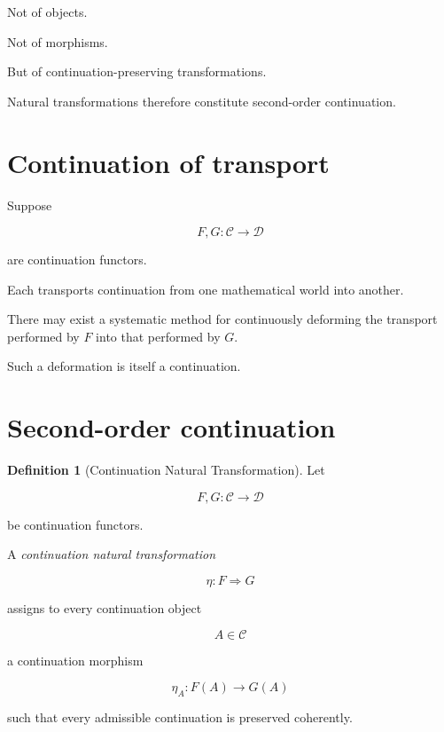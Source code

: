 \documentclass[13pt,openany]{book}
\theoremstyle{plain}
\theoremstyle{definition}
\newtheorem{definition}{Definition}[chapter]
\begin{document}
Not of objects.

Not of morphisms.

But of continuation-preserving transformations.

Natural transformations therefore constitute second-order continuation.

\section{Continuation of transport}

Suppose

\[
F,G:\mathcal C\longrightarrow\mathcal D
\]

are continuation functors.

Each transports continuation from one mathematical world into another.

There may exist a systematic method for continuously deforming the transport
performed by \(F\) into that performed by \(G\).

Such a deformation is itself a continuation.

\section{Second-order continuation}

\begin{definition}[Continuation Natural Transformation]

Let

\[
F,G:\mathcal C\rightarrow\mathcal D
\]

be continuation functors.

A \emph{continuation natural transformation}

\[
\eta:F\Longrightarrow G
\]

assigns to every continuation object

\[
A\in\mathcal C
\]

a continuation morphism

\[
\eta_A:
F(A)
\longrightarrow
G(A)
\]

such that every admissible continuation is preserved coherently.

\end{definition}
\end{document}
